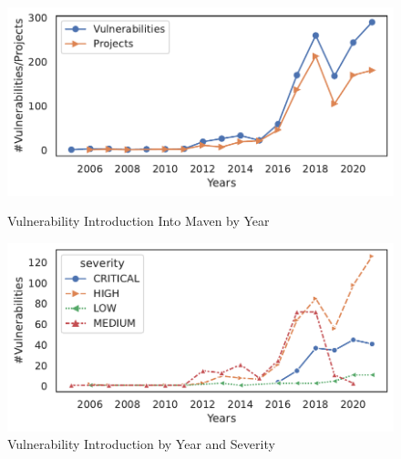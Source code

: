 \begin{figure}
    \centering
    \includegraphics[width=1\linewidth]{chapters/ch3/figs/vuln_affected_pkg.pdf}
    \vspace{-18pt}
    \caption{Vulnerability Introduction Into Maven by Year}
    \label{ch3:fig:vuln_affected_pkgs}
%
    \vspace{9pt}
%
    \includegraphics[width=1\linewidth]{chapters/ch3/figs/vuln_severity.pdf}
    \vspace{-18pt}
    \caption{Vulnerability Introduction by Year and Severity}
    \label{ch3:fig:vuln_sev}
\end{figure}
